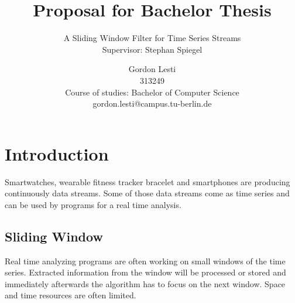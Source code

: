 \documentclass[runningheads,a4paper]{llncs}
\begin{document}
    \graphicspath{ {../img/} }
    \mainmatter

    \title{Proposal for Bachelor Thesis}
    \subtitle{A Sliding Window Filter for Time Series Streams\\
    \textnormal{\small{Supervisor: Stephan Spiegel\\\vspace{1\baselineskip}}}}


    \author{Gordon Lesti\\313249\\Course of studies: Bachelor of Computer Science\\gordon.lesti@campus.tu-berlin.de\\\vspace{5\baselineskip}}



    \maketitle

    \section{Introduction}
    Smartwatches, wearable fitness tracker bracelet and smartphones are producing continuously data streams. Some of
    those data streams come as time series and can be used by programs for a real time analysis.

    \subsection{Sliding Window}
    Real time analyzing programs are often working on small windows of the time series. Extracted information from the
    window will be processed or stored and immediately afterwards the algorithm has to focus on the next window. Space
    and time resources are often limited.
\end{document}
